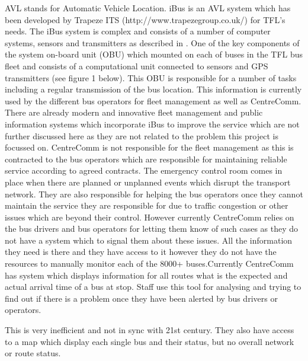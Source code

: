AVL stands for Automatic Vehicle Location. iBus is an AVL system which
has been developed by Trapeze ITS (http://www.trapezegroup.co.uk/) for
TFL’s needs. The iBus system is complex and consists of a number of computer
systems, sensors and transmitters as described in \cite{Hounsell201276}. One of the key
components of the system on-board unit (OBU) which mounted on each of
buses in the TFL bus fleet and consists of a computational unit connected to
sensors and GPS transmitters (see figure 1 below). This OBU is responsible
for a number of tasks including a regular transmission of the bus location.
This information is currently used by the different bus operators for fleet management
as well as CentreComm. There are already modern and innovative
fleet management and public information systems which incorporate iBus to
improve the service which are not further discussed here as they are not related
to the problem this project is focussed on.
CentreComm is not responsible for the fleet management as this is contracted
to the bus operators which are responsible for maintaining reliable
service according to agreed contracts. The emergency control room comes in
place when there are planned or unplanned events which disrupt the transport
network. They are also responsible for helping the bus operators once they cannot
maintain the service they are responsible for due to traffic congestion or
other issues which are beyond their control. However currently CentreComm
relies on the bus drivers and bus operators for letting them know of such cases
as they do not have a system which to signal them about these issues. All the
information they need is there and they have access to it however they do not
have the resources to manually monitor each of the 8000+ buses.Currently CentreComm has system which displays information for all routes
what is the expected and actual arrival time of a bus at stop. Staff use this
tool for analysing and trying to find out if there is a problem once they have
been alerted by bus drivers or operators. 

This is very inefficient and not in sync with 21st century. They also have access to a map which display each single bus and their status, but no overall network or route status.

